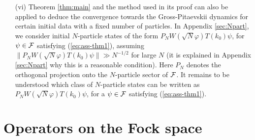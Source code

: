 \documentclass[11pt,a4paper]{article}
\newtheorem{thm}{Theorem}[section]  %
\newcommand{\eps}{\varepsilon}
\newcommand{\bR}{{\mathbb R}}
\newcommand{\bN}{{\mathbb N}}
\newcommand{\tr}{\mbox{Tr}}
\newcommand{\cF}{{\cal F}}
\newcommand{\cH}{{\cal H}}
\begin{document}
\begin{itemize}
\item[(vi)] Theorem \ref{thm:main} and the method used in its proof can also be applied to deduce the convergence towards the Gross-Pitaevskii dynamics for certain initial data with a fixed number of particles. In Appendix \ref{sec:Npart}, we consider initial $N$-particle states of the form 
$P_N W(\sqrt{N} \varphi) T(k_0) \psi$, for $\psi \in \cF$ satisfying (\ref{eq:ass-thm1}), assuming 
$\| P_N W(\sqrt{N} \varphi) T(k_0) \psi \| \gg N^{-1/2}$ for large $N$ (it is explained in Appendix \ref{sec:Npart} why this is a reasonable condition). Here $P_N$ denotes the orthogonal projection onto the $N$-particle sector of $\cF$. It remains to be understood which class of $N$-particle states can be written as $P_N W(\sqrt{N} \varphi) T(k_0) \psi$, for a $\psi \in \cF$ satisfying (\ref{eq:ass-thm1}).
\end{itemize}



\section{Operators on the Fock space}
\label{sec:fock}
\end{document}
